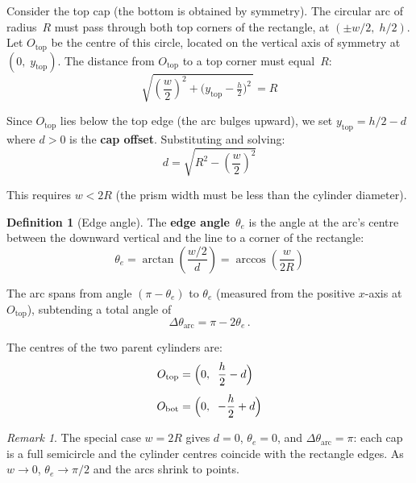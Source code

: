 \documentclass[11pt,a4paper]{article}
\theoremstyle{plain}
\theoremstyle{definition}
\newtheorem{definition}[theorem]{Definition}
\theoremstyle{remark}
\newtheorem{remark}[theorem]{Remark}
\begin{document}
Consider the top cap (the bottom is obtained by symmetry).  The circular arc of radius~$R$ must pass through both top corners of the rectangle, at $(\pm w/2,\; h/2)$.  Let $O_{\mathrm{top}}$ be the centre of this circle, located on the vertical axis of symmetry at $(0,\; y_{\mathrm{top}})$.  The distance from $O_{\mathrm{top}}$ to a top corner must equal~$R$:
\begin{equation}
    \sqrt{\left(\frac{w}{2}\right)^{\!2} + \bigl(y_{\mathrm{top}} - \tfrac{h}{2}\bigr)^2\,} = R
    \label{eq:circle-constraint}
\end{equation}

Since $O_{\mathrm{top}}$ lies below the top edge (the arc bulges upward), we set $y_{\mathrm{top}} = h/2 - d$ where $d > 0$ is the \textbf{cap offset}.  Substituting and solving:
\begin{equation}
    \boxed{\;d = \sqrt{R^2 - \left(\frac{w}{2}\right)^{\!2}}\;}
    \label{eq:cap-offset}
\end{equation}

This requires $w < 2R$ (the prism width must be less than the cylinder diameter).

\begin{definition}[Edge angle]
\label{def:edge-angle}
The \textbf{edge angle}~$\theta_e$ is the angle at the arc's centre between the downward vertical and the line to a corner of the rectangle:
\begin{equation}
    \boxed{\;\theta_e = \arctan\!\left(\frac{w/2}{d}\right) = \arccos\!\left(\frac{w}{2R}\right)\;}
    \label{eq:edge-angle}
\end{equation}
\end{definition}

\noindent
The arc spans from angle $(\pi - \theta_e)$ to $\theta_e$ (measured from the positive $x$-axis at $O_{\mathrm{top}}$), subtending a total angle of
\begin{equation}
    \Delta\theta_{\mathrm{arc}} = \pi - 2\theta_e\,.
    \label{eq:arc-span}
\end{equation}

The centres of the two parent cylinders are:
\begin{align}
    O_{\mathrm{top}} &= \Bigl(0,\;\; \frac{h}{2} - d\Bigr) \label{eq:Otop}\\[4pt]
    O_{\mathrm{bot}} &= \Bigl(0,\;\; -\frac{h}{2} + d\Bigr) \label{eq:Obot}
\end{align}

\begin{remark}
The special case $w = 2R$ gives $d = 0$, $\theta_e = 0$, and $\Delta\theta_{\mathrm{arc}} = \pi$: each cap is a full semicircle and the cylinder centres coincide with the rectangle edges.  As $w \to 0$, $\theta_e \to \pi/2$ and the arcs shrink to points.
\end{remark}
\end{document}
